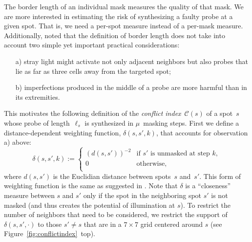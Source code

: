 \documentclass{llncs}
\begin{document}
The border length of an individual mask measures the quality of that
mask. We are more interested in estimating the risk of synthesizing a faulty
probe at a given spot. That is, we need a per-spot measure
instead of a per-mask measure. Additionally, \cite{KAHNG03A} noted
that the definition of border length does not take into account two
simple yet important practical considerations:
\begin{itemize}
\item[a)] stray light might activate not only adjacent neighbors but
  also probes that lie as far as three cells away from the targeted
  spot;
\item[b)] imperfections produced in the middle of a probe are more
  harmful than in its extremities.
\end{itemize}
This motivates the following definition of the \emph{conflict
  index}~$\mathcal{C}(s)$ of a spot~$s$ whose probe of
length~$\ell_{s}$ is synthesized in $\mu$~masking steps. First we
define a distance-dependent weighting function, $\delta(s,s',k)$, that
accounts for observation a) above:
\begin{equation}
\label{eq:dist_weight}
\delta(s,s',k) :=
        \left\{
                \begin{array}{ll}
                        (d(s,s'))^{-2} & \mbox{if $s'$ is unmasked at step $k$}, \\
                        0 & \mbox{otherwise}, \\
                \end{array}
        \right.
\end{equation}
where $d(s,s')$ is the Euclidian distance between spots~$s$ and~$s'$.
This form of weighting function is the same as suggested in
\cite{KAHNG03A}.  Note that $\delta$ is a ``closeness'' measure
between $s$ and $s'$ only if the spot in the neighboring spot $s'$ is
not masked (and thus creates the potential of illumination at $s$). To
restrict the number of neighbors that need to be considered, we
restrict the support of $\delta(s,s',\cdot)$ to those $s'\neq s$ that
are in a $7\times 7$ grid centered around $s$ (see
Figure~\ref{fig:conflictindex}~top).
\end{document}
